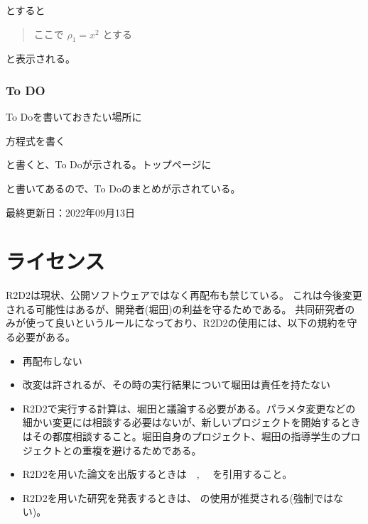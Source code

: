 \documentclass[letterpaper,10pt,dvipdfmx,report]{sphinxmanual}
\begin{document}
\sphinxAtStartPar
とすると
\begin{quote}

\sphinxAtStartPar
ここで \(\rho_1=x^2\) とする
\end{quote}

\sphinxAtStartPar
と表示される。


\subsection{To DO}
\label{\detokenize{sphinx:to-do}}
\sphinxAtStartPar
To Doを書いておきたい場所に

\begin{sphinxVerbatim}[commandchars=\\\{\}]
  方程式を書く
\end{sphinxVerbatim}

\sphinxAtStartPar
と書くと、To Doが示される。トップページに

\begin{sphinxVerbatim}[commandchars=\\\{\}]
\end{sphinxVerbatim}

\sphinxAtStartPar
と書いてあるので、To Doのまとめが示されている。

\sphinxAtStartPar
最終更新日：2022年09月13日


\chapter{ライセンス}
\label{\detokenize{index:id1}}
\sphinxAtStartPar
R2D2は現状、公開ソフトウェアではなく再配布も禁じている。
これは今後変更される可能性はあるが、開発者(堀田)の利益を守るためである。
共同研究者のみが使って良いというルールになっており、R2D2の使用には、以下の規約を守る必要がある。
\begin{itemize}
\item {} 
\sphinxAtStartPar
再配布しない

\item {} 
\sphinxAtStartPar
改変は許されるが、その時の実行結果について堀田は責任を持たない

\item {} 
\sphinxAtStartPar
R2D2で実行する計算は、堀田と議論する必要がある。パラメタ変更などの細かい変更には相談する必要はないが、新しいプロジェクトを開始するときはその都度相談すること。堀田自身のプロジェクト、堀田の指導学生のプロジェクトとの重複を避けるためである。

\item {} 
\sphinxAtStartPar
R2D2を用いた論文を出版するときは　, 　を引用すること。

\item {} 
\sphinxAtStartPar
R2D2を用いた研究を発表するときは、 の使用が推奨される(強制ではない)。

\end{itemize}
\end{document}
